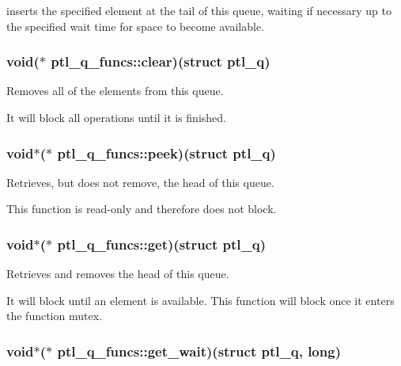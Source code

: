 inserts the specified element at the tail of this queue, waiting if necessary up to the specified wait time for space to become available. 

\hypertarget{structptl__q__funcs_edefac643e9f7206be76e0aeede68e0a}{
\subsubsection{\setlength{\rightskip}{0pt plus 5cm}void($\ast$ {\bf ptl\_\-q\_\-funcs::clear})(struct {\bf ptl\_\-q})}}
\label{structptl__q__funcs_edefac643e9f7206be76e0aeede68e0a}


Removes all of the elements from this queue. 

It will block all operations until it is finished. \hypertarget{structptl__q__funcs_c58092f69ff82e52e3fbb8cf31eb2adc}{
\subsubsection{\setlength{\rightskip}{0pt plus 5cm}void$\ast$($\ast$ {\bf ptl\_\-q\_\-funcs::peek})(struct {\bf ptl\_\-q})}}
\label{structptl__q__funcs_c58092f69ff82e52e3fbb8cf31eb2adc}


Retrieves, but does not remove, the head of this queue. 

This function is read-only and therefore does not block. \hypertarget{structptl__q__funcs_d321c7f9c2972b4791fd827dca5f04c8}{
\subsubsection{\setlength{\rightskip}{0pt plus 5cm}void$\ast$($\ast$ {\bf ptl\_\-q\_\-funcs::get})(struct {\bf ptl\_\-q})}}
\label{structptl__q__funcs_d321c7f9c2972b4791fd827dca5f04c8}


Retrieves and removes the head of this queue. 

It will block until an element is available. This function will block once it enters the function mutex. \hypertarget{structptl__q__funcs_a580c7543fb38eaffee9c40c470da528}{
\subsubsection{\setlength{\rightskip}{0pt plus 5cm}void$\ast$($\ast$ {\bf ptl\_\-q\_\-funcs::get\_\-wait})(struct {\bf ptl\_\-q}, long)}}
\label{structptl__q__funcs_a580c7543fb38eaffee9c40c470da528}


